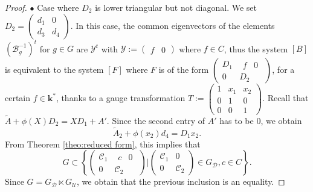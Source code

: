 \documentclass[a4paper,11pt]{amsart}
\newcommand{\Gdiag}{G_{\mathcal{D}}}
\newcommand{\Gunip}{G_{\mathcal{U}}}
\begin{document}
\begin{proof}
$\bullet$ Case where $D_2$ is lower triangular but not diagonal. We set $D_2 = \begin{pmatrix}
d_1 & 0 \\ d_3 & d_4
\end{pmatrix}$. In this case, the common eigenvectors of the  elements $(\mathscr{B}_g^{-1})^t$ for $g\in G$ are  $\mathscr{Y}^{t}$ with $\mathscr{Y}:=\begin{pmatrix}
    f & 0 
\end{pmatrix}$ where $f\in C$, thus the system $[B]$ is equivalent to the system $[F]$ where $F$ is of the form $\begin{pmatrix}
D_1& \begin{matrix} f& 0 \end{matrix} \\ 
0 &D_2
\end{pmatrix}$, for a certain $f\in \mathbf{k}^*$, thanks to a gauge transformation $T:=\begin{pmatrix}
1& x_1& x_2 \\ 
0 & 1 &0 \\
0&0&1
\end{pmatrix}$.  Recall that $\widetilde{A}+\phi(X)D_2=XD_1+A'$.  Since the second entry of $A'$ has to be $0$,  we obtain 
\begin{equation}
    \label{eq:eqaverifierD2triang}
    \widetilde{A}_2+\phi(x_2)d_4= D_1 x_2.
\end{equation}
From Theorem \ref{theo:reduced form}, this implies that
$$G\subset \left\{ \begin{pmatrix}
\mathscr{C}_1& \begin{matrix} c&0 \end{matrix} \\ 
0 & \mathscr{C}_2
\end{pmatrix}\Bigg|   \begin{pmatrix}
\mathscr{C}_1& 0 \\ 
0 & \mathscr{C}_2
\end{pmatrix} \in \Gdiag,   c\in C \right\}.
$$
Since $G = \Gdiag\ltimes \Gunip$, we obtain that the previous inclusion is an equality. 



\end{proof}
\end{document}

